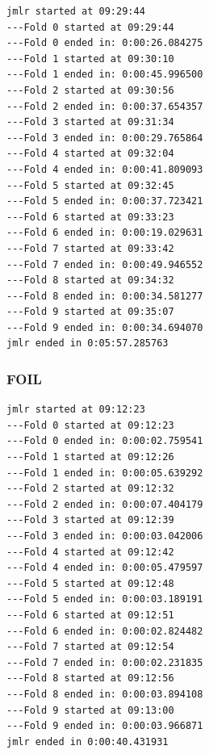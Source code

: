 \begin{verbatim}
jmlr started at 09:29:44
---Fold 0 started at 09:29:44
---Fold 0 ended in: 0:00:26.084275
---Fold 1 started at 09:30:10
---Fold 1 ended in: 0:00:45.996500
---Fold 2 started at 09:30:56
---Fold 2 ended in: 0:00:37.654357
---Fold 3 started at 09:31:34
---Fold 3 ended in: 0:00:29.765864
---Fold 4 started at 09:32:04
---Fold 4 ended in: 0:00:41.809093
---Fold 5 started at 09:32:45
---Fold 5 ended in: 0:00:37.723421
---Fold 6 started at 09:33:23
---Fold 6 ended in: 0:00:19.029631
---Fold 7 started at 09:33:42
---Fold 7 ended in: 0:00:49.946552
---Fold 8 started at 09:34:32
---Fold 8 ended in: 0:00:34.581277
---Fold 9 started at 09:35:07
---Fold 9 ended in: 0:00:34.694070
jmlr ended in 0:05:57.285763
\end{verbatim}
\subsubsection{FOIL}

\begin{verbatim}
jmlr started at 09:12:23
---Fold 0 started at 09:12:23
---Fold 0 ended in: 0:00:02.759541
---Fold 1 started at 09:12:26
---Fold 1 ended in: 0:00:05.639292
---Fold 2 started at 09:12:32
---Fold 2 ended in: 0:00:07.404179
---Fold 3 started at 09:12:39
---Fold 3 ended in: 0:00:03.042006
---Fold 4 started at 09:12:42
---Fold 4 ended in: 0:00:05.479597
---Fold 5 started at 09:12:48
---Fold 5 ended in: 0:00:03.189191
---Fold 6 started at 09:12:51
---Fold 6 ended in: 0:00:02.824482
---Fold 7 started at 09:12:54
---Fold 7 ended in: 0:00:02.231835
---Fold 8 started at 09:12:56
---Fold 8 ended in: 0:00:03.894108
---Fold 9 started at 09:13:00
---Fold 9 ended in: 0:00:03.966871
jmlr ended in 0:00:40.431931
\end{verbatim}
